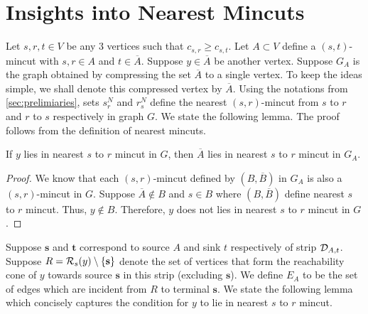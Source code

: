 \section{Insights into Nearest Mincuts}
\label{sec:insights-nearest-mincuts}

Let $s,r,t \in V$ be any $3$ vertices such that $c_{s,r} \geq c_{s,t}$. Let $A\subset V$ define a $(s,t)$-mincut with $s,r \in A$ and $t\in {\overline A}$. Suppose $y \in {\overline A}$ be another vertex. Suppose $G_A$ is the graph obtained by compressing the set ${\overline A}$ to a single vertex. To keep the ideas simple, we shall denote this compressed vertex by ${\overline A}$. Using the notations from \ref{sec:prelimiaries}, sets $s_r^N$ and $r_s^N$ define the nearest $(s,r)$-mincut from $s$ to $r$ and $r$ to $s$ respectively in graph $G$. We state the following lemma. The proof follows from the definition of nearest mincuts.

\begin{lemma}
\label{lem:y-in-nearest-(r,s)-G_A}
If $y$ lies in nearest $s$ to $r$ mincut in $G$, then ${\overline A}$ lies in nearest $s$ to $r$ mincut in $G_A$.
\end{lemma}
\begin{proof}
We know that each $(s,r)$-mincut defined by $(B, {\overline B})$ in $G_A$ is also a $(s,r)$-mincut in $G$. Suppose $\overline{A} \not \in B$ and $s \in B$ where $(B,{\overline B})$ define nearest $s$ to $r$ mincut. Thus, $y \not \in B$. Therefore, $y$ does not lies in nearest $s$ to $r$ mincut in $G$. 
\end{proof}


Suppose $\mathbf s$ and $\mathbf t$ correspond to source $A$ and sink $t$ respectively of strip ${\cal D}_{A,t}$. Suppose $R={\cal R}_s(y)\setminus\{\mathbf{s}\}$ denote the set of vertices that form the reachability cone of $y$ towards source $\mathbf s$ in this strip (excluding $\mathbf s$). We define $E_A$ to be the set of edges which are incident from $R$ to terminal $\mathbf s$. We state the following lemma which concisely captures the condition for $y$ to lie in nearest $s$ to $r$ mincut.



